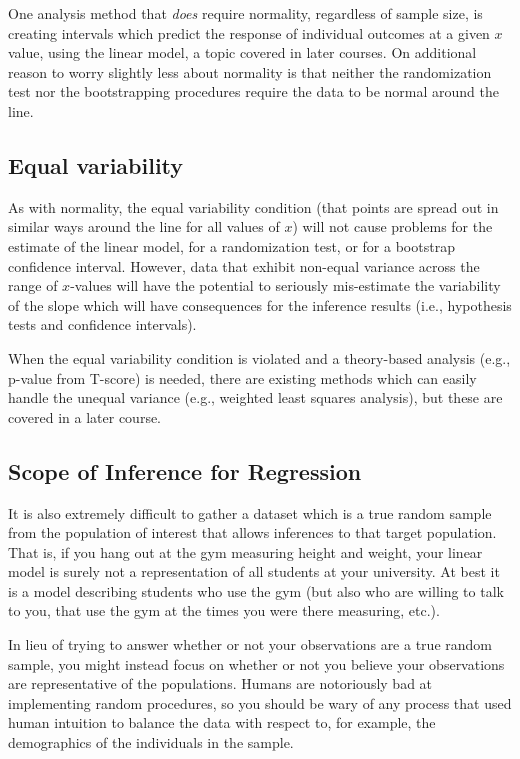 \documentclass[
  10pt,
  openany]{book}
\theoremstyle{definition}
\theoremstyle{definition}
\theoremstyle{definition}
\theoremstyle{definition}
\theoremstyle{remark}
\begin{document}
One analysis method that \emph{does} require normality, regardless of sample size, is creating intervals which predict the response of individual outcomes at a given \(x\) value, using the linear model, a topic covered in later courses.
On additional reason to worry slightly less about normality is that neither the randomization test nor the bootstrapping procedures require the data to be normal around the line.

\subsection{\texorpdfstring{\textbf{E}qual variability}{Equal variability}}\label{equal-variability}

As with normality, the equal variability condition (that points are spread out in similar ways around the line for all values of \(x\)) will not cause problems for the estimate of the linear model, for a randomization test, or for a bootstrap confidence interval.
However, data that exhibit non-equal variance across the range of \(x\)-values will have the potential to seriously mis-estimate the variability of the slope which will have consequences for the inference results (i.e., hypothesis tests and confidence intervals).

When the equal variability condition is violated and a theory-based analysis (e.g., p-value from T-score) is needed, there are existing methods which can easily handle the unequal variance (e.g., weighted least squares analysis), but these are covered in a later course.

\subsection{Scope of Inference for Regression}\label{scope-of-inference-for-regression}

It is also extremely difficult to gather a dataset which is a true random sample from the population of interest that allows inferences to that target population. That is, if you hang out at the gym measuring height and weight, your linear model is surely not a representation of all students at your university. At best it is a model describing students who use the gym (but also who are willing to talk to you, that use the gym at the times you were there measuring, etc.).

In lieu of trying to answer whether or not your observations are a true random sample, you might instead focus on whether or not you believe your observations are representative of the populations.
Humans are notoriously bad at implementing random procedures, so you should be wary of any process that used human intuition to balance the data with respect to, for example, the demographics of the individuals in the sample.
\end{document}
